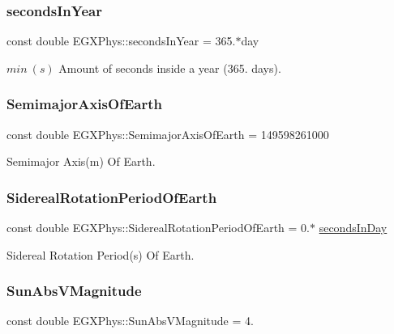 \subsubsection{\texorpdfstring{seconds\+In\+Year}{secondsInYear}}
{\footnotesize\ttfamily const double E\+G\+X\+Phys\+::seconds\+In\+Year = 365.$\ast$day}

$min\ (s)$ Amount of seconds inside a year (365. days). \mbox{\label{namespace_e_g_x_phys_ad1bdca5cec4a0f4a4b8a18ead61de6d9}} 
\subsubsection{\texorpdfstring{Semimajor\+Axis\+Of\+Earth}{SemimajorAxisOfEarth}}
{\footnotesize\ttfamily const double E\+G\+X\+Phys\+::\+Semimajor\+Axis\+Of\+Earth = 149598261000}

Semimajor Axis(m) Of Earth. \mbox{\label{namespace_e_g_x_phys_a34a388ac3f9196bb3cdbdbee5ff3cdb7}} 
\subsubsection{\texorpdfstring{Sidereal\+Rotation\+Period\+Of\+Earth}{SiderealRotationPeriodOfEarth}}
{\footnotesize\ttfamily const double E\+G\+X\+Phys\+::\+Sidereal\+Rotation\+Period\+Of\+Earth = 0.$\ast$ \mbox{\hyperlink{namespace_e_g_x_phys_ab4f86327f64403b843077ecc189ce52b}{seconds\+In\+Day}}}

Sidereal Rotation Period(s) Of Earth. \mbox{\label{namespace_e_g_x_phys_a61266dc1aaacdd9a9bd0f2fa92aa21c9}} 
\subsubsection{\texorpdfstring{Sun\+Abs\+V\+Magnitude}{SunAbsVMagnitude}}
{\footnotesize\ttfamily const double E\+G\+X\+Phys\+::\+Sun\+Abs\+V\+Magnitude = 4.}

